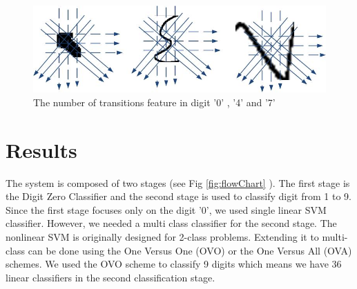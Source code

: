 \documentclass[times, 10pt,twocolumn]{article}
\begin{document}
 \begin{figure}
	\centering
		\includegraphics[scale=0.23]{Trans2}
	\caption[Transition features] {The number of transitions feature in digit '0' , '4' and '7' }
	\label{fig:featTrans}
\end{figure}
%
%
%
%




\section {Results}
\label{sec:Results}


The system is composed of two stages (see Fig \ref{fig:flowChart} ). The first stage is the Digit Zero Classifier and the second stage is used to classify digit from 1 to 9. Since the first stage focuses only on the  digit '0', we used single linear SVM classifier. However, we needed a multi class classifier for the second stage. The nonlinear SVM is originally designed for 2-class problems. Extending it to multi-class can be done using the One Versus One (OVO) or the One Versus All (OVA) schemes. We used the OVO scheme to classify 9 digits which means we have 36 linear classifiers in the second classification stage.
\end{document}
